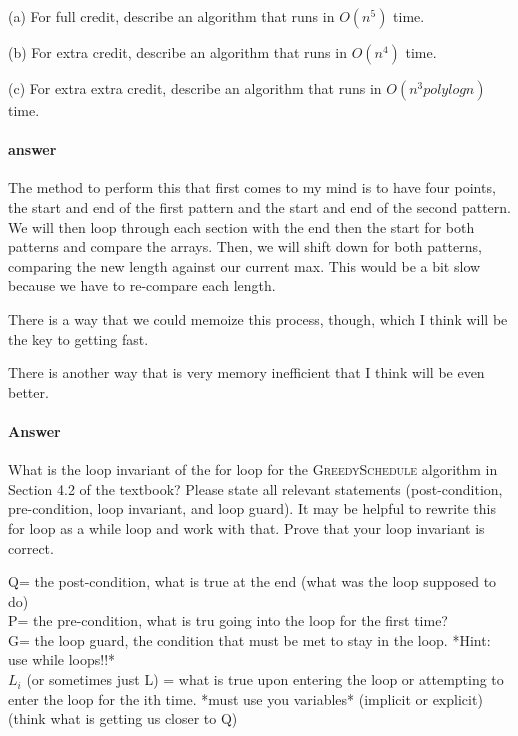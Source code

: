 \documentclass{article}
\begin{document}
(a) For full credit, describe an algorithm that runs in $O(n^{5})$ time.

(b) For extra credit, describe an algorithm that runs in $O(n^{4})$ time.

(c) For extra extra credit, describe an algorithm that runs in $O(n^{3} polylog n)$
time.

\paragraph{answer}

The method to perform this that first comes to my mind is to have four points,
the start and end of the first pattern and the start and end of the second pattern.
We will then loop through each section with the end then the start for both patterns
and compare the arrays. Then, we will shift down for both patterns, comparing the new
length against our current max. This would be a bit slow because we have to re-compare
each length.

There is a way that we could memoize this process, though, which I think will be the
key to getting fast.

There is another way that is very memory inefficient that I think will be even better.

\paragraph{Answer}

\todo{}

\collab{}

What is the loop invariant of the for loop for the \textsc{GreedySchedule}
algorithm in Section 4.2 of the textbook?  Please state all relevant statements
(post-condition, pre-condition, loop invariant, and loop guard).  It may be
helpful to rewrite this for loop as a while loop and work with that.  Prove that
your loop invariant is correct.

Q= the post-condition, what is true at the end (what was the loop supposed to do) \\
P= the pre-condition, what is tru going into the loop for the first time? \\
G= the loop guard, the condition that must be met to stay in the loop. *Hint: use while loops!!* \\
$L_{i}$ (or sometimes just L) = what is true upon entering the loop or attempting to enter the loop for the ith time. *must use you variables* (implicit or explicit) (think what is getting us closer to Q)
\end{document}
